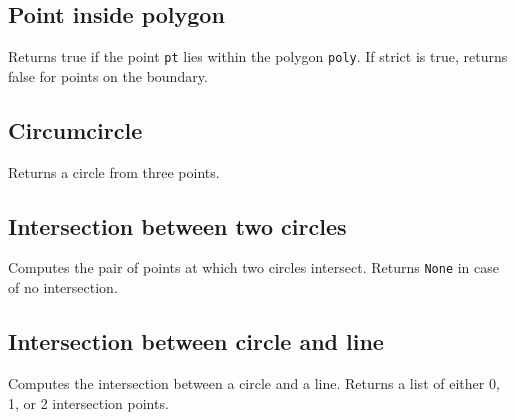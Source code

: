 \documentclass{article}
\begin{document}
\subsection*{Point inside polygon}
Returns true if the point \lstinline{pt} lies within the polygon \lstinline{poly}.
If strict is true, returns false for points on the boundary.
\begin{multicols}{2}

\columnbreak

\end{multicols}

\vspace*{-1cm}

\subsection*{Circumcircle}
Returns a circle from three points.
\begin{multicols}{2}
  
  \columnbreak
  
\end{multicols}

\subsection*{Intersection between two circles}
Computes the pair of points at which two circles intersect. Returns \lstinline{None} in case of no intersection.
\begin{multicols}{2}
  
  \columnbreak
  
\end{multicols}

\subsection*{Intersection between circle and line}
Computes the intersection between a circle and a line. Returns a list of either 0, 1, or 2 intersection points.
\begin{multicols}{2}
  
  \columnbreak
  
\end{multicols}
\end{document}
